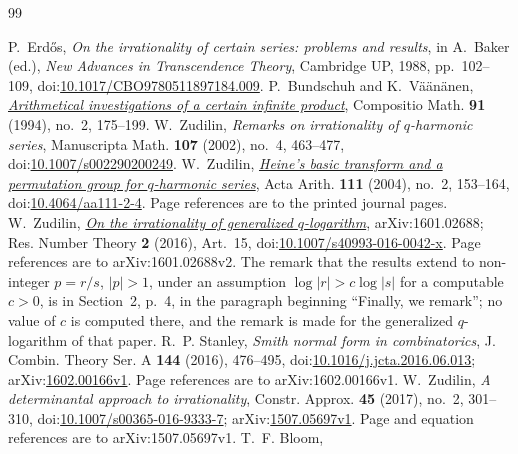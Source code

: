 \documentclass[11pt]{article}
\begin{document}
\begin{thebibliography}{99}
\small
\raggedright
\setlength{\itemsep}{2pt}
 P.~Erd\H{o}s, \emph{On the irrationality of certain series:
  problems and results}, in A.~Baker (ed.), \emph{New Advances in Transcendence
  Theory}, Cambridge UP, 1988, pp.~102--109,
  doi:\href{https://doi.org/10.1017/CBO9780511897184.009}{10.1017/CBO9780511897184.009}.
 P.~Bundschuh and K.~V\"a\"an\"anen,
  \href{https://numdam.org/item/CM_1994__91_2_175_0.pdf}{\emph{Arithmetical
  investigations of a certain infinite product}},
  Compositio Math. \textbf{91} (1994), no.~2, 175--199.
 W.~Zudilin, \emph{Remarks on irrationality of
  \(q\)-harmonic series}, Manuscripta Math. \textbf{107} (2002), no.~4,
  463--477,
  doi:\href{https://doi.org/10.1007/s002290200249}{10.1007/s002290200249}.
 W.~Zudilin,
  \href{https://geodesic.mathdoc.fr/articles/10.4064/aa111-2-4/}{\emph{Heine's
  basic transform and a permutation group for \(q\)-harmonic series}},
  Acta Arith. \textbf{111} (2004), no.~2, 153--164,
  doi:\href{https://doi.org/10.4064/aa111-2-4}{10.4064/aa111-2-4}.
  Page references are to the printed journal pages.
 W.~Zudilin,
  \href{https://arxiv.org/abs/1601.02688v2}{\emph{On the irrationality of
  generalized \(q\)-logarithm}}, arXiv:1601.02688; Res. Number Theory
  \textbf{2} (2016), Art.~15,
  doi:\href{https://doi.org/10.1007/s40993-016-0042-x}{10.1007/s40993-016-0042-x}.
  Page references are to arXiv:1601.02688v2.
  The remark that the results extend to non-integer \(p=r/s\), \(|p|>1\), under
  an assumption \(\log|r|>c\log|s|\) for a computable \(c>0\), is in Section~2,
  p.~4, in the paragraph beginning ``Finally, we remark''; no value of \(c\) is
  computed there, and the remark is made for the generalized \(q\)-logarithm of
  that paper.
 R.~P. Stanley, \emph{Smith normal form in combinatorics},
  J. Combin. Theory Ser. A \textbf{144} (2016), 476--495,
  doi:\href{https://doi.org/10.1016/j.jcta.2016.06.013}{10.1016/j.jcta.2016.06.013};
  arXiv:\href{https://arxiv.org/abs/1602.00166v1}{1602.00166v1}.
  Page references are to arXiv:1602.00166v1.
 W.~Zudilin, \emph{A determinantal approach to
  irrationality}, Constr. Approx. \textbf{45} (2017), no.~2, 301--310,
  doi:\href{https://doi.org/10.1007/s00365-016-9333-7}{10.1007/s00365-016-9333-7};
  arXiv:\href{https://arxiv.org/abs/1507.05697v1}{1507.05697v1}.
  Page and equation references are to arXiv:1507.05697v1.
 T.~F. Bloom,

\end{thebibliography}
\end{document}
